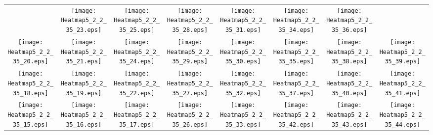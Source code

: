 \documentclass{standalone}
\begin{document}
\renewcommand{\arraystretch}{0}
\setlength{\tabcolsep}{0pt}
\begin{tabular}{ *8{c} }
 & \texttt{[image: Heatmap5\_2\_2\_35\_23.eps]} & \texttt{[image: Heatmap5\_2\_2\_35\_25.eps]} & \texttt{[image: Heatmap5\_2\_2\_35\_28.eps]} & \texttt{[image: Heatmap5\_2\_2\_35\_31.eps]} & \texttt{[image: Heatmap5\_2\_2\_35\_34.eps]} & \texttt{[image: Heatmap5\_2\_2\_35\_36.eps]} &  \\
\texttt{[image: Heatmap5\_2\_2\_35\_20.eps]} & \texttt{[image: Heatmap5\_2\_2\_35\_21.eps]} & \texttt{[image: Heatmap5\_2\_2\_35\_24.eps]} & \texttt{[image: Heatmap5\_2\_2\_35\_29.eps]} & \texttt{[image: Heatmap5\_2\_2\_35\_30.eps]} & \texttt{[image: Heatmap5\_2\_2\_35\_35.eps]} & \texttt{[image: Heatmap5\_2\_2\_35\_38.eps]} & \texttt{[image: Heatmap5\_2\_2\_35\_39.eps]} \\
\texttt{[image: Heatmap5\_2\_2\_35\_18.eps]} & \texttt{[image: Heatmap5\_2\_2\_35\_19.eps]} & \texttt{[image: Heatmap5\_2\_2\_35\_22.eps]} & \texttt{[image: Heatmap5\_2\_2\_35\_27.eps]} & \texttt{[image: Heatmap5\_2\_2\_35\_32.eps]} & \texttt{[image: Heatmap5\_2\_2\_35\_37.eps]} & \texttt{[image: Heatmap5\_2\_2\_35\_40.eps]} & \texttt{[image: Heatmap5\_2\_2\_35\_41.eps]} \\
\texttt{[image: Heatmap5\_2\_2\_35\_15.eps]} & \texttt{[image: Heatmap5\_2\_2\_35\_16.eps]} & \texttt{[image: Heatmap5\_2\_2\_35\_17.eps]} & \texttt{[image: Heatmap5\_2\_2\_35\_26.eps]} & \texttt{[image: Heatmap5\_2\_2\_35\_33.eps]} & \texttt{[image: Heatmap5\_2\_2\_35\_42.eps]} & \texttt{[image: Heatmap5\_2\_2\_35\_43.eps]} & \texttt{[image: Heatmap5\_2\_2\_35\_44.eps]} \\

\end{tabular}
\end{document}

